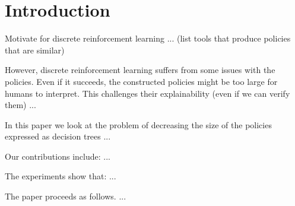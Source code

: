 \section {Introduction}%
\label {sec:introduction}

Motivate for discrete reinforcement learning ... (list tools that produce policies that are similar)

However, discrete reinforcement learning suffers from some issues with the policies. Even if it succeeds, the constructed policies might be too large for humans to interpret. This challenges their explainability (even if we can verify them) ...

In this paper we look at the problem of decreasing the size of the policies expressed as decision trees ...

Our contributions include: ...

The experiments show that: ...

The paper proceeds as follows. ...

\lipsum[3-4]
